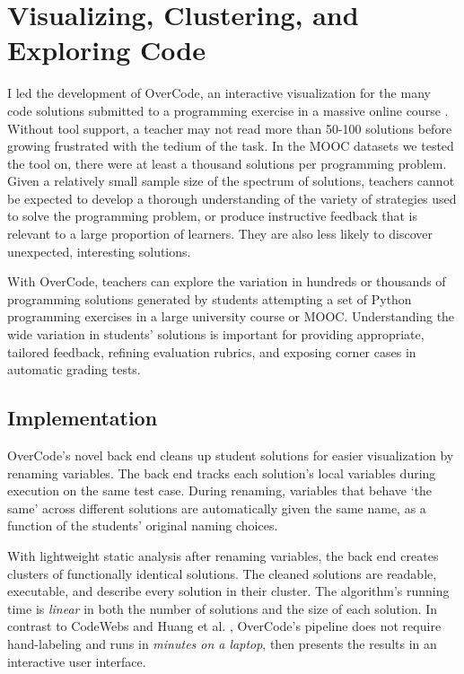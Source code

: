 \documentclass{sigchi}
\begin{document}
\section{Visualizing, Clustering, and Exploring Code}
I led the development of OverCode, an interactive visualization for the many code solutions submitted to a programming exercise in a massive online course \cite{OverCode}. Without tool support, a teacher may not read more than 50-100 solutions before growing frustrated with the tedium of the task. In the MOOC datasets we tested the tool on, there were at least a thousand solutions per programming problem. Given a relatively small sample size of the spectrum of solutions, teachers cannot be expected to develop a thorough understanding of the variety of strategies used to solve the programming problem, or produce instructive feedback that is relevant to a large proportion of learners. They are also less likely to discover unexpected, interesting solutions.

With OverCode, teachers can explore the variation in hundreds or thousands of programming solutions generated by students attempting a set of Python programming exercises in a large university course or MOOC. Understanding the wide variation in students' solutions is important for providing appropriate, tailored feedback, refining evaluation rubrics, and exposing corner cases in automatic grading tests.

\subsection{Implementation}
OverCode's novel back end cleans up student solutions for easier visualization by renaming variables. The back end tracks each solution's local variables during execution on the same test case. During renaming, variables that behave `the same' across different solutions are automatically given the same name, as a function of the students' original naming choices.

With lightweight static analysis after renaming variables, the back end creates clusters of functionally identical solutions. The cleaned solutions are readable, executable, and describe every solution in their cluster. The algorithm's running time is \emph{linear} in both the number of solutions and the size of each solution. In contrast to CodeWebs \cite{codewebs} and Huang et al. \citeyear{MOOCshop}, OverCode's pipeline does not require hand-labeling and runs in \emph{minutes on a laptop}, then presents the results in an interactive user interface.
\end{document}
